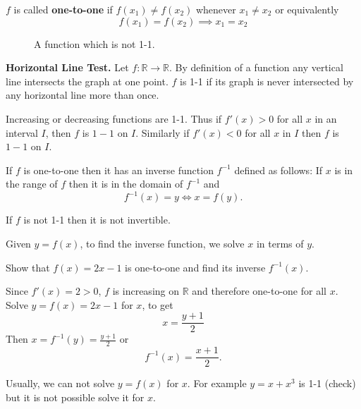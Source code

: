 \documentclass[../calc1-main.tex]{subfiles}
\begin{document}
  \begin{definition}
    $f$ is called \textbf{one-to-one} if $f(x_1) \neq f(x_2)$ whenever $x_1 \neq x_2$ or equivalently
    \[
      f(x_1) = f(x_2) \implies x_1 = x_2
    \]
  \end{definition}

  \begin{figure}[H]
   \centering
   
   \caption{A function which is not 1-1.}
 \end{figure}

 \textbf{Horizontal Line Test.}
 Let $f: \mathbb{R} \to \mathbb{R}$. By definition of a function any vertical line intersects the graph at one point. $f$ is 1-1 if its graph is never intersected by any horizontal line more than once.

 \begin{theorem}
  Increasing or decreasing functions are 1-1. Thus if $f'(x)>0$ for all $x$ in an interval $I$, then $f$ is $1-1$ on $I$. Similarly if $f'(x)<0$ for all $x$ in $I$ then $f$ is $1-1$ on $I$.
\end{theorem}

\begin{definition}
  If $f$ is one-to-one then it has an inverse function $f^{-1}$ defined as follows: If $x$ is in the range of $f$ then it is in the domain of $f^{-1}$ and
  \[
    f^{-1}(x) = y \iff x = f(y).
  \]
\end{definition}
If $f$ is not 1-1 then it is not invertible.

Given $y=f(x)$, to find the inverse function, we solve $x$ in terms of $y$.
\begin{example}
  Show that $f(x) = 2x -1$ is one-to-one and find its inverse $f^{-1}(x)$.
\end{example}
\begin{solution}
  Since $f'(x) = 2 >0$, $f$ is increasing on $\mathbb{R}$ and therefore one-to-one for all $x$. Solve $y=f(x) = 2x-1$ for $x$, to get
  \[
    x = \frac{y+1}{2}
  \]
  Then $x = f^{-1}(y) = \frac{y+1}{2}$ or
  \[
    f^{-1}(x) = \frac{x+1}{2}.
  \]
\end{solution}

Usually, we can not solve $y=f(x)$ for $x$. For example $y=x+x^3$ is 1-1 (check) but it is not possible solve it for $x$.
\end{document}
